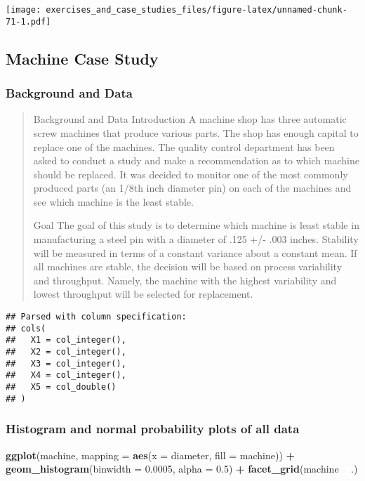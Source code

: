 \documentclass[]{book}
\newenvironment{Shaded}{\begin{snugshade}}{\end{snugshade}}
\newcommand{\DataTypeTok}[1]{\textcolor[rgb]{0.13,0.29,0.53}{#1}}
\newcommand{\FloatTok}[1]{\textcolor[rgb]{0.00,0.00,0.81}{#1}}
\newcommand{\KeywordTok}[1]{\textcolor[rgb]{0.13,0.29,0.53}{\textbf{#1}}}
\newcommand{\NormalTok}[1]{#1}
\newcommand{\OperatorTok}[1]{\textcolor[rgb]{0.81,0.36,0.00}{\textbf{#1}}}
\newcommand{\StringTok}[1]{\textcolor[rgb]{0.31,0.60,0.02}{#1}}
\theoremstyle{definition}
\theoremstyle{definition}
\theoremstyle{definition}
\theoremstyle{remark}
\begin{document}
\texttt{[image: exercises\_and\_case\_studies\_files/figure-latex/unnamed-chunk-71-1.pdf]}

\hypertarget{machine-case-study}{%
\subsection{Machine Case Study}\label{machine-case-study}}

\hypertarget{background-and-data-3}{%
\subsubsection{Background and Data}\label{background-and-data-3}}

\begin{quote}
Background and Data Introduction A machine shop has three automatic
screw machines that produce various parts. The shop has enough capital
to replace one of the machines. The quality control department has been
asked to conduct a study and make a recommendation as to which machine
should be replaced. It was decided to monitor one of the most commonly
produced parts (an 1/8th inch diameter pin) on each of the machines and
see which machine is the least stable.

Goal The goal of this study is to determine which machine is least
stable in manufacturing a steel pin with a diameter of .125 +/- .003
inches. Stability will be measured in terms of a constant variance about
a constant mean. If all machines are stable, the decision will be based
on process variability and throughput. Namely, the machine with the
highest variability and lowest throughput will be selected for
replacement.
\end{quote}

\begin{verbatim}
## Parsed with column specification:
## cols(
##   X1 = col_integer(),
##   X2 = col_integer(),
##   X3 = col_integer(),
##   X4 = col_integer(),
##   X5 = col_double()
## )
\end{verbatim}

\hypertarget{histogram-and-normal-probability-plots-of-all-data-1}{%
\subsubsection{Histogram and normal probability plots of all
data}\label{histogram-and-normal-probability-plots-of-all-data-1}}

\begin{Shaded}
\begin{Highlighting}[]
\KeywordTok{ggplot}\NormalTok{(machine, }\DataTypeTok{mapping =} \KeywordTok{aes}\NormalTok{(}\DataTypeTok{x =}\NormalTok{ diameter, }\DataTypeTok{fill =}\NormalTok{ machine)) }\OperatorTok{+}
\StringTok{  }\KeywordTok{geom_histogram}\NormalTok{(}\DataTypeTok{binwidth =} \FloatTok{0.0005}\NormalTok{, }\DataTypeTok{alpha =} \FloatTok{0.5}\NormalTok{) }\OperatorTok{+}
\StringTok{  }\KeywordTok{facet_grid}\NormalTok{(machine }\OperatorTok{~}\StringTok{ }\NormalTok{.)}
\end{Highlighting}
\end{Shaded}
\end{document}
